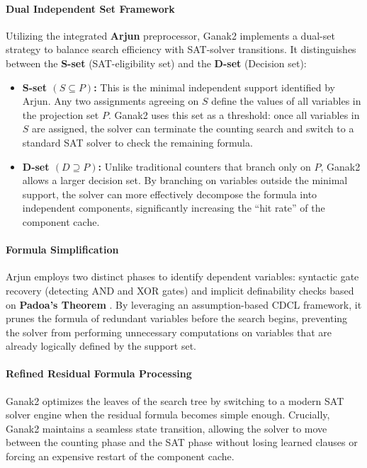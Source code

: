 \documentclass{report}
\begin{document}
\paragraph{Dual Independent Set Framework} Utilizing the integrated \textbf{Arjun} \cite{arjun} preprocessor, 
Ganak2 implements a dual-set strategy to balance search efficiency with SAT-solver transitions. 
It distinguishes between the \textbf{S-set} (SAT-eligibility set) and the \textbf{D-set} (Decision set):
\begin{itemize}
\item \textbf{S-set $(S \subseteq P)$:} This is the minimal independent support identified by Arjun. 
    Any two assignments agreeing on $S$ define the values of all variables in the projection set $P$. 
    Ganak2 uses this set as a threshold: once all variables in $S$ are assigned, 
    the solver can terminate the counting search and switch to a standard SAT solver to check the remaining formula.
\item \textbf{D-set $(D \supseteq P)$:} Unlike traditional counters that branch only on $P$, 
    Ganak2 allows a larger decision set. By branching on variables outside the minimal support, 
    the solver can more effectively decompose the formula into independent components, 
    significantly increasing the ``hit rate'' of the component cache.
\end{itemize}
\vspace{-1em}
\paragraph{Formula Simplification} Arjun employs two distinct phases to identify dependent variables: 
syntactic gate recovery (detecting AND and XOR gates) and implicit definability checks based on \textbf{Padoa's Theorem} \cite{padoa}. 
By leveraging an assumption-based CDCL framework, it prunes the 
formula of redundant variables before the search begins, preventing the solver from performing 
unnecessary computations on variables that are already logically defined by the support set.
\vspace{-1em}
\paragraph{Refined Residual Formula Processing} Ganak2 optimizes the leaves of the search tree 
by switching to a modern SAT solver engine when the residual formula becomes simple enough. 
Crucially, Ganak2 maintains a seamless state transition, allowing the solver to move between the counting phase and the 
SAT phase without losing learned clauses or forcing an expensive restart of the component cache.
\end{document}

